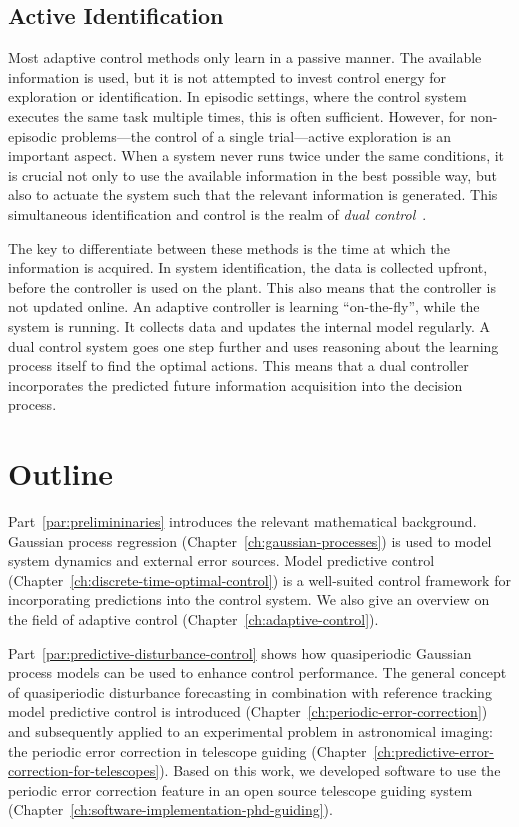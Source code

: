 \subsection*{Active Identification}

Most adaptive control methods only learn in a passive manner. The available
information is used, but it is not attempted to invest control energy for
exploration or identification. In episodic settings, where the control system
executes the same task multiple times, this is often sufficient. However, for
non-episodic problems---the control of a single trial---active exploration is
an important aspect. When a system never runs twice under the same conditions,
it is crucial not only to use the available information in the best possible
way, but also to actuate the system such that the relevant information is
generated. This simultaneous identification and control is the realm of
\emph{dual control}~\cite{Wittenmark:1995:Adaptive}.

The key to differentiate between these methods is the time at which the
information is acquired. In system identification, the data is collected
upfront, before the controller is used on the plant. This also means that the
controller is not updated online. An adaptive controller is learning
``on-the-fly'', while the system is running. It collects data and updates the
internal model regularly. A dual control system goes one step further and uses
reasoning about the learning process itself to find the optimal actions. This
means that a dual controller incorporates the predicted future information
acquisition into the decision process.

\section*{Outline}

Part~\ref{par:prelimininaries} introduces the relevant mathematical background.
Gaussian process regression (Chapter~\ref{ch:gaussian-processes}) is used to
model system dynamics and external error sources. Model predictive control
(Chapter~\ref{ch:discrete-time-optimal-control}) is a well-suited control
framework for incorporating predictions into the control system. We also give
an overview on the field of adaptive control
(Chapter~\ref{ch:adaptive-control}).

Part~\ref{par:predictive-disturbance-control} shows how quasiperiodic Gaussian
process models can be used to enhance control performance. The general concept
of quasiperiodic disturbance forecasting in combination with reference tracking
model predictive control is introduced
(Chapter~\ref{ch:periodic-error-correction}) and subsequently applied to an
experimental problem in astronomical imaging: the periodic error correction in
telescope guiding (Chapter~\ref{ch:predictive-error-correction-for-telescopes}).
Based on this work, we developed software to use the periodic error correction
feature in an open source telescope guiding system
(Chapter~\ref{ch:software-implementation-phd-guiding}).

